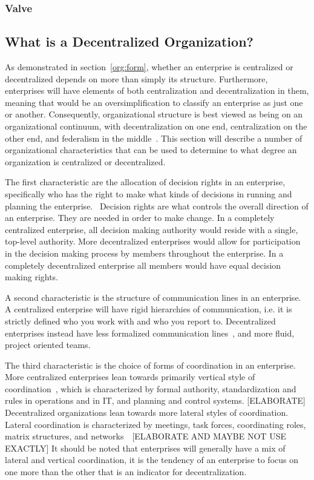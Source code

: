 \subsubsection{Valve}

\subsection{What is a Decentralized Organization?}

As demonstrated in section~\ref{org:form}, whether an enterprise is centralized or decentralized depends on more than simply its structure. Furthermore, enterprises will have elements of both centralization and decentralization in them, meaning that would be an oversimplification to classify an enterprise as just one or another. Consequently, organizational structure is best viewed as being on an organizational continuum, with decentralization on one end, centralization on the other end, and federalism in the middle~\cite{pearlson2009}. This section will describe a number of organizational characteristics that can be used to determine to what degree an organization is centralized or decentralized. 

The first characteristic are the allocation of decision rights in an enterprise, specifically who has the right to make what kinds of decisions in running and planning the enterprise.~\cite{pearlson2009} Decision rights are what controls the overall direction of an enterprise. They are needed in order to make change. In a completely centralized enterprise, all decision making authority would reside with a single, top-level authority. More decentralized enterprises would allow for participation in the decision making process by members throughout the enterprise. In a completely decentralized enterprise all members would have equal decision making rights. 

A second characteristic is the structure of communication lines in an enterprise. A centralized enterprise will have rigid hierarchies of communication, i.e. it is strictly defined who you work with and who you report to. Decentralized enterprises instead have less formalized communication lines~\cite{pearlson2009}, and more fluid, project oriented teams.~\cite{Applegate1988a}

The third characteristic is the choice of forms of coordination in an enterprise. More centralized enterprises lean towards primarily vertical style of coordination~\cite{Bolman2008}, which is characterized by formal authority, standardization and rules in operations and in IT, and planning and control systems. [ELABORATE] Decentralized organizations lean towards more lateral styles of coordination. Lateral coordination is characterized by meetings, task forces, coordinating roles, matrix structures, and networks~~\cite{Bolman2008}[ELABORATE AND MAYBE NOT USE EXACTLY] It should be noted that enterprises will generally have a mix of lateral and vertical coordination, it is the tendency of an enterprise to focus on one more than the other that is an indicator for decentralization. 

